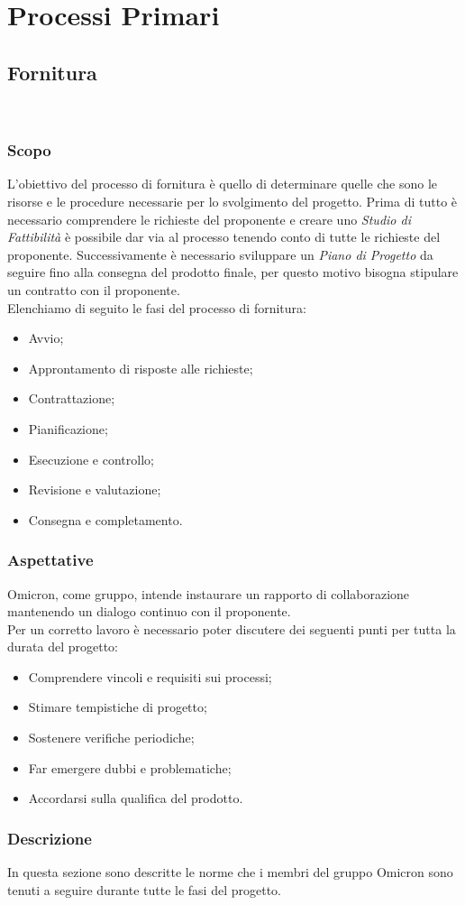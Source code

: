 \section{Processi Primari}
\subsection{Fornitura}\
\subsubsection{Scopo}
L'obiettivo del processo di fornitura è quello di determinare quelle che sono le risorse e le procedure necessarie per lo svolgimento del progetto. 
Prima di tutto è necessario comprendere le richieste del proponente e creare uno \textit{Studio di Fattibilità} è possibile dar via al processo tenendo conto di tutte le richieste del proponente.
Successivamente è necessario sviluppare un \textit{Piano di Progetto} da seguire fino alla consegna del prodotto finale, per questo motivo bisogna stipulare un contratto con il proponente.\\
Elenchiamo di seguito le fasi del processo di fornitura:
\begin{itemize}
    \item{Avvio;}
    \item{Approntamento di risposte alle richieste;}
    \item{Contrattazione;}
    \item{Pianificazione;}
    \item{Esecuzione e controllo;}
    \item{Revisione e valutazione;}
    \item{Consegna e completamento.}
\end{itemize}

\subsubsection{Aspettative}
Omicron, come gruppo, intende instaurare un rapporto di collaborazione mantenendo un dialogo continuo con il proponente.\\
Per un corretto lavoro è necessario poter discutere dei seguenti punti per tutta la durata del progetto:

\begin{itemize}
    \item{Comprendere vincoli e requisiti sui processi;}
    \item{Stimare tempistiche di progetto;}
    \item{Sostenere verifiche periodiche;}
    \item{Far emergere dubbi e problematiche;}
    \item{Accordarsi sulla qualifica del prodotto.}
\end{itemize}

\subsubsection{Descrizione}
In questa sezione sono descritte le norme che i membri del gruppo Omicron sono tenuti a seguire durante tutte le fasi del progetto.
